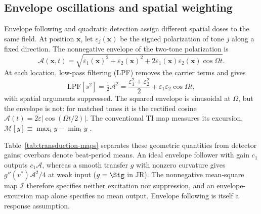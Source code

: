 \subsection{Envelope oscillations and spatial weighting}\label{sec:envelope}
Envelope following and quadratic detection assign different spatial doses
to the same field. At position $\mathbf x$, let $\varepsilon_j(\mathbf x)$ be
the signed polarization of tone $j$ along a fixed direction. The nonnegative
envelope of the two-tone polarization is
\[
\mathcal A(\mathbf x,t)=\sqrt{\varepsilon_1(\mathbf x)^2+\varepsilon_2(\mathbf x)^2
+2\varepsilon_1(\mathbf x)\varepsilon_2(\mathbf x)\cos\Omega t}.
\]
At each location, low-pass filtering (LPF) removes the carrier terms and gives
\begin{equation}
\mathrm{LPF}[s^2]=\tfrac12\mathcal A^2
=\frac{\varepsilon_1^2+\varepsilon_2^2}{2}+\varepsilon_1\varepsilon_2\cos\Omega t,
\label{eq:sqenv}
\end{equation}
with spatial arguments suppressed. The squared envelope is sinusoidal at
$\Omega$, but the envelope is not: for matched tones it is the rectified
cosine $\mathcal A(t)=2\varepsilon|\cos(\Omega t/2)|$.
The conventional TI map measures its excursion,
$\mathcal M[y]\equiv\max_t y-\min_t y$ \cite{grossman2017}.

Table~\ref{tab:transduction-maps} separates these geometric quantities from
detector gains; overbars denote beat-period means. An ideal envelope follower
with gain $c_1$ outputs $c_1\mathcal A$, whereas a smooth transfer $g$ with
nonzero curvature gives $g''(v^*)\mathcal A^2/4$ at weak input ($g=\Sig$ in JR).
The nonnegative mean-square map $\mathcal I$ therefore specifies neither excitation
nor suppression, and an envelope-excursion map alone specifies no mean output.
Envelope following is itself a response assumption.

